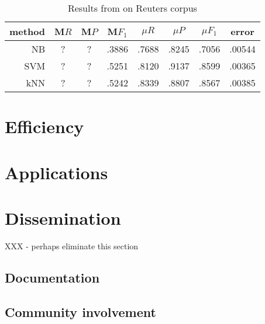 \begin{table}
\begin{tabular}{|r c c c c c c c|}
\hline
method & M$R$ & M$P$ & M$F_1$ & $\mu R$ & $\mu P$ & $\mu F_1$ & error \\
\hline
NB  & ? & ? & .3886 & .7688 & .8245 & .7056 & .00544 \\
SVM & ? & ? & .5251 & .8120 & .9137 & .8599 & .00365 \\
kNN & ? & ? & .5242 & .8339 & .8807 & .8567 & .00385 \\
\hline
\end{tabular}
\caption{Results from \cite{yang:99} on Reuters corpus}
\end{table}


\section{Efficiency}
\label{Efficiency}

\section{Applications}
\label{Applications}

\section{Dissemination}
XXX - perhaps eliminate this section

\subsection{Documentation}
\subsection{Community involvement}
